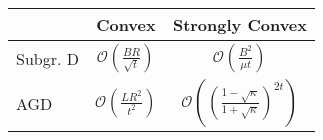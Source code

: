 \documentclass{standalone}
\begin{document}
\begin{tabular}{l|c|c}
    & Convex & Strongly Convex \\
    \hline
    Subgr. D & $\mathcal{O}\left(\frac{BR}{\sqrt{t}}\right)$ & $\mathcal{O}\left(\frac{B^2}{\mu t}\right)$ \\[2ex]
    AGD & $\mathcal{O}\left(\frac{LR^2}{t^2}\right)$ & $\mathcal{O}\left(\left(\frac{1-\sqrt{\kappa}}{1+\sqrt{\kappa}}\right)^{2t}\right)$ \\
    \end{tabular}
\end{document}
